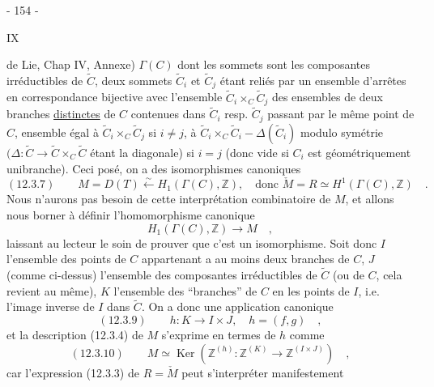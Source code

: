 
\begin{center}- 154 -\end{center}
\begin{flushright}IX\end{flushright}

de Lie, Chap IV, Annexe) $\Gamma(C)$ dont les sommets sont les composantes irréductibles de $\widetilde C$, deux sommets $\widetilde C_i$ et $\widetilde C_j$ étant reliés par un ensemble d'arrêtes en correspondance bijective avec l'ensemble $\widetilde C_i\times_C\widetilde C_j$ des ensembles de deux branches \uline{distinctes} de $C$ contenues dans $\widetilde C_i$ resp. $\widetilde C_j$ passant par le même point de $C$, ensemble égal à $\widetilde C_i\times_C\widetilde C_j$ si $i\neq j$, à $\widetilde C_i\times_C\widetilde C_i-\Delta(\widetilde C_i)$ modulo symétrie $(\Delta:\widetilde C\longrightarrow\widetilde C\times_C\widetilde C$ étant la diagonale) si $i=j$ (donc vide si $C_i$ est géométriquement unibranche). Ceci posé, on a des isomorphismes canoniques
\[
(12.3.7)\qquad M=D(T)\xleftarrow{\sim}H_1(\Gamma(C),\mathbb Z),
\quad\text{donc }\check M=R\simeq H^1(\Gamma(C),\mathbb Z)\quad.
\]
Nous n'aurons pas besoin de cette interprétation combinatoire de $M$, et allons nous borner à définir l'homomorphisme canonique
\[
H_1(\Gamma(C),\mathbb Z)\longrightarrow M\quad,
\]
laissant au lecteur le soin de prouver que c'est un isomorphisme. Soit donc $I$ l'ensemble des points de $C$ appartenant a au moins deux branches de $C$, $J$ (comme ci-dessus) l'ensemble des composantes irréductibles de $\widetilde C$ (ou de $C$, cela revient au même), $K$ l'ensemble des ``branches'' de $C$ en les points de $I$, i.e. l'image inverse de $I$ dans $\widetilde C$. On a donc une application canonique
\[
(12.3.9)\qquad h:K\longrightarrow I\times J,\quad h=(f,g)\quad,
\]
et la description (12.3.4) de $M$ s'exprime en termes de $h$ comme
\[
(12.3.10)\qquad M\simeq\operatorname{Ker}(\mathbb Z^{(h)}:\mathbb Z^{(K)}
\longrightarrow\mathbb Z^{(I\times J)})\quad,
\]
car l'expression (12.3.3) de $R=\check M$ peut s'interpréter manifestement

